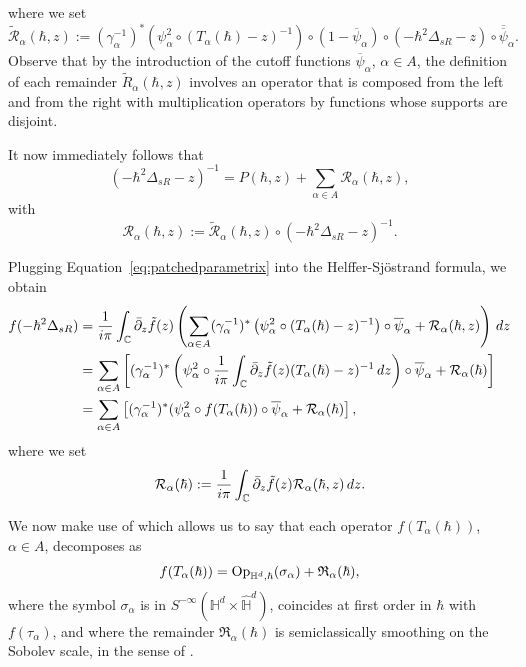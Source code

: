 \documentclass[12pt,a4paper]{amsart}
\theoremstyle{plain}
\theoremstyle{definition}
\theoremstyle{remark}
\numberwithin{equation}{section}
\theoremstyle{definition}
\def\C{{\mathbb C}}%
\def \Op{{\rm Op}}
\def \Heis{\mathbb{H}}
\def \Hhat{\widehat{\Heis}}
\numberwithin{equation}{section}
\begin{document}
where we set
\begin{equation*}
    \tilde{\mathcal{R}}_\alpha(\hbar,z) := (\gamma_\alpha^{-1})^* \left(\psi_\alpha^2\circ (T_\alpha(\hbar)-z)^{-1}\right) \circ (1-\overline{\psi}_\alpha) \circ (-\hbar^2 \Delta_{sR}-z)\circ \overline{\overline{\psi}}_\alpha.
\end{equation*}
Observe that by the introduction of the cutoff functions $\overline{\psi}_\alpha$, $\alpha\in A$, the definition of each remainder $\tilde{R}_\alpha(\hbar,z)$ involves an operator that is composed from the left and from the right with multiplication operators by functions whose supports are disjoint.

It now immediately follows that
\begin{equation}
    \label{eq:patchedparametrix}
    (-\hbar^2\Delta_{sR}-z)^{-1} = P(\hbar,z) + \sum_{\alpha\in A}\mathcal{R}_\alpha(\hbar,z),
\end{equation}
with
\begin{equation*}
    \mathcal{R}_\alpha(\hbar,z) := \tilde{\mathcal{R}}_\alpha(\hbar,z)\circ (-\hbar^2\Delta_{sR}-z)^{-1}.
\end{equation*}

Plugging Equation~\eqref{eq:patchedparametrix} into the Helffer-Sjöstrand formula, we obtain
\begin{equation*}
    \begin{aligned}
        f(-\hbar^2\Delta_{sR}) 
        &= \frac{1}{i\pi}\int_{\C}\Bar{\partial}_z\tilde{f}(z)\left(\sum_{\alpha\in A} (\gamma_\alpha^{-1})^* \left(\psi_\alpha^2\circ (T_\alpha(\hbar)-z)^{-1}\right) \circ \overline{\psi}_\alpha + \mathcal{R}_\alpha(\hbar,z)\right)\,dz\\
        &= \sum_{\alpha\in A}  \left[(\gamma_\alpha^{-1})^*\left(\psi_\alpha^2\circ\frac{1}{i\pi}\int_{\C}\Bar{\partial}_z\tilde{f}(z)(T_\alpha(\hbar)-z)^{-1}\,dz \right)\circ \overline{\psi}_\alpha + \mathcal{R}_\alpha(\hbar)\right]\\
        &= \sum_{\alpha\in A}\left[ (\gamma_\alpha^{-1})^*(\psi_\alpha^2\circ f(T_\alpha(\hbar))\circ \overline{\psi}_\alpha + \mathcal{R}_\alpha(\hbar)\right],
    \end{aligned}
\end{equation*}
where we set
\begin{equation*}
    \mathcal{R}_\alpha(\hbar) := \frac{1}{i\pi}\int_\C \Bar{\partial}_z \tilde{f}(z) \mathcal{R}_\alpha(\hbar,z)\,dz.
\end{equation*}

We now make use of \cite[Theorem 6.7]{FM} which allows us to say that each operator $f(T_\alpha(\hbar))$, $\alpha\in A$, decomposes as 
\begin{equation*}
    f(T_\alpha(\hbar)) = \Op_{\Heis^d,\hbar}(\sigma_\alpha) + \mathfrak{R}_\alpha(\hbar),
\end{equation*}
where the symbol $\sigma_\alpha$ is in $S^{-\infty}(\Heis^d\times\Hhat^d)$, coincides at first order in $\hbar$ with $f(\tau_\alpha)$, and where the remainder $\mathfrak{R}_\alpha(\hbar)$ is semiclassically smoothing on the Sobolev scale, in the sense of \cite[Definition 5.9]{FM}.
\end{document}
